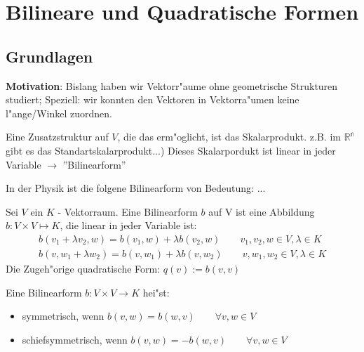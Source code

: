 \documentclass[oneside,fontsize=11pt,paper=a4,BCOR=0mm,DIV=12,automark,headsepline]{scrbook}
\theoremstyle{remark}
\theoremstyle{definition}
\theoremstyle{definition}
\theoremstyle{remark}
\begin{document}
\part{Bilineare und Quadratische Formen}
\chapter{Grundlagen}
\label{sec:bili}
\textbf{Motivation}: Bislang haben wir Vektorr"aume ohne geometrische Strukturen
studiert; Speziell: wir konnten den Vektoren in Vektorra"umen keine
l"ange/Winkel zuordnen.

Eine Zusatzstruktur auf $V$, die das erm"oglicht, ist das Skalarprodukt. z.B.
im $\mathbb{R^n}$ gibt es das Standartskalarprodukt...) Dieses Skalarpordukt ist
linear in jeder Variable $\rightarrow$ ''Bilinearform''

In der Physik ist die folgene Bilinearform von Bedeutung: ...

\begin{definition}{}{}
  Sei $V$ ein $K$ - Vektorraum. Eine Bilinearform $b$ auf V ist eine Abbildung
  $b: V\times V \mapsto K$, die linear in jeder Variable ist:
  \begin{align*}
    b(v_1 + \lambda v_2, w) = b(v_1, w) + \lambda b(v_2, w) \qquad v_1, v_2, w \in V, \lambda \in K\\
    b(v, w_1+\lambda w_2) = b(v, w_1) + \lambda b(v, w_2) \qquad v, w_1, w_2 \in V, \lambda \in K
  \end{align*}
  Die Zugeh"orige quadratische Form: $q(v):=b(v,v)$ 
\end{definition}

\begin{definition}{}{}
  Eine Bilinearform \(b: V\times V \to K\) hei"st:
  \begin{itemize}
  \item symmetrisch, wenn \(b(v, w) = b(w, v)\qquad \forall v, w\in V\)
  \item schiefsymmetrisch, wenn \(b(v, w) = -b(w, v)\qquad \forall v, w\in V\)
  \end{itemize}
\end{definition}
\end{document}
